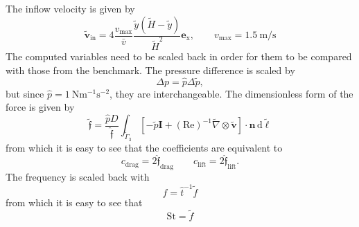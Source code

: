 \documentclass[]{scrartcl}
\renewcommand{\d}{\,\mathrm{d}}
\newcommand{\bs}[1]{\boldsymbol{#1}}
\begin{document}
The inflow velocity is given by
\begin{equation*}
	\bs{\tilde{v}}_\textrm{in} = 4\dfrac{v_\textrm{max}}{\bar{v}}\dfrac{\tilde{y}(\tilde{H}-\tilde{y})}{\tilde{H}^2}\bs{e}_\textrm{x},
	\qquad
	v_\textrm{max} = \SI{1.5}{\meter\per\second}
\end{equation*}
The computed variables need to be scaled back in order for them to be compared with those from the benchmark. The pressure difference is scaled by
\begin{equation*}
	\Delta p = \hat{p} \Delta \tilde{p},
\end{equation*}
but since $\hat{p} = \SI{1}{\newton\meter^{-1}\second^{-2}}$, they are interchangeable. The dimensionless form of the force is given by
\begin{equation*}
	\bs{\tilde{\mathfrak{f}}} = \dfrac{\hat{p}D}{\hat{\mathfrak{f}}} \int_{\tilde{\Gamma}_3} [-\tilde{p}\bs{I} + (\textrm{Re})^{-1} \tilde{\nabla} \otimes \bs{\tilde{v}}] \cdot \bs{n} \d \tilde{\ell}
\end{equation*}
from which it is easy to see that the coefficients are equivalent to
\begin{equation*}
	c_\textrm{drag} = 2 \hat{\mathfrak{f}}_\textrm{drag}
	\qquad
	c_\textrm{lift} = 2 \hat{\mathfrak{f}}_\textrm{lift}.
\end{equation*}
The frequency is scaled back with
\begin{equation*}
	f = \hat{t}^{-1} \tilde{f}
\end{equation*}
from which it is easy to see that 
\begin{equation*}
	\textrm{St} = \tilde{f}
\end{equation*}
\end{document}
